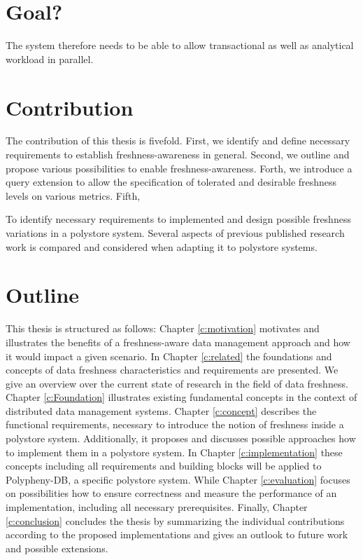 
\section{Goal?}
The system therefore needs to be able to allow transactional as well as analytical workload in parallel. 



\section{Contribution}
The contribution of this thesis is fivefold. First, we identify and define necessary requirements to establish freshness-awareness in general.
Second, we outline and propose various possibilities to enable freshness-awareness. Forth, we introduce a query extension to allow the specification
of tolerated and desirable freshness levels on various metrics. Fifth, 

To identify necessary requirements to implemented and design possible 
freshness variations in a polystore system. Several aspects of previous published research work is compared and considered when adapting it to polystore systems.



\section{Outline}
This thesis is structured as follows:
Chapter \ref{c:motivation} motivates and illustrates the benefits of a freshness-aware data management approach and how it would impact a given scenario.
In Chapter \ref{c:related} the foundations and concepts of data freshness characteristics and requirements are presented.
We give an overview over the current state of research in the field of data freshness. 
Chapter \ref{c:Foundation} illustrates existing fundamental concepts in the context of distributed data management systems. 
Chapter \ref{c:concept} describes the functional requirements, necessary to introduce the notion of freshness inside a polystore system. Additionally, 
it proposes and discusses possible approaches how to implement them in a polystore system. 
In Chapter \ref{c:implementation} these concepts including all requirements and building blocks will be applied to Polypheny-DB, a specific polystore system.
While Chapter \ref{c:evaluation} focuses on possibilities how to ensure correctness and measure the performance of an implementation, including all necessary prerequisites.
Finally, Chapter \ref{c:conclusion} concludes the thesis by summarizing the individual contributions according to the proposed
implementations and gives an outlook to future work and possible extensions.


